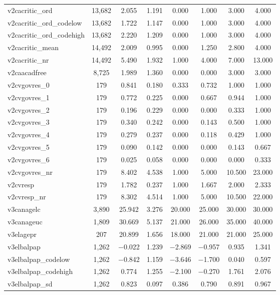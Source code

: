 \begin{table}[!htbp]
\begin{tabular}{@{\extracolsep{5pt}}lccccccc}
v2cacritic\_ord & 13,682 & 2.055 & 1.191 & 0.000 & 1.000 & 3.000 & 4.000 \\ 
v2cacritic\_ord\_codelow & 13,682 & 1.722 & 1.147 & 0.000 & 1.000 & 3.000 & 4.000 \\ 
v2cacritic\_ord\_codehigh & 13,682 & 2.220 & 1.209 & 0.000 & 1.000 & 3.000 & 4.000 \\ 
v2cacritic\_mean & 14,492 & 2.009 & 0.995 & 0.000 & 1.250 & 2.800 & 4.000 \\ 
v2cacritic\_nr & 14,492 & 5.490 & 1.932 & 1.000 & 4.000 & 7.000 & 13.000 \\ 
v2caacadfree & 8,725 & 1.989 & 1.360 & 0.000 & 0.000 & 3.000 & 3.000 \\ 
v2cvgovres\_0 & 179 & 0.841 & 0.180 & 0.333 & 0.732 & 1.000 & 1.000 \\ 
v2cvgovres\_1 & 179 & 0.772 & 0.225 & 0.000 & 0.667 & 0.944 & 1.000 \\ 
v2cvgovres\_2 & 179 & 0.196 & 0.229 & 0.000 & 0.000 & 0.333 & 1.000 \\ 
v2cvgovres\_3 & 179 & 0.340 & 0.242 & 0.000 & 0.143 & 0.500 & 1.000 \\ 
v2cvgovres\_4 & 179 & 0.279 & 0.237 & 0.000 & 0.118 & 0.429 & 1.000 \\ 
v2cvgovres\_5 & 179 & 0.090 & 0.142 & 0.000 & 0.000 & 0.143 & 0.667 \\ 
v2cvgovres\_6 & 179 & 0.025 & 0.058 & 0.000 & 0.000 & 0.000 & 0.333 \\ 
v2cvgovres\_nr & 179 & 8.402 & 4.538 & 1.000 & 5.000 & 10.500 & 23.000 \\ 
v2cvresp & 179 & 1.782 & 0.237 & 1.000 & 1.667 & 2.000 & 2.333 \\ 
v2cvresp\_nr & 179 & 8.302 & 4.514 & 1.000 & 5.000 & 10.500 & 22.000 \\ 
v3canagelc & 3,890 & 25.942 & 3.276 & 20.000 & 25.000 & 30.000 & 30.000 \\ 
v3canageuc & 1,809 & 30.669 & 5.137 & 21.000 & 26.000 & 35.000 & 40.000 \\ 
v3elagepr & 207 & 20.899 & 1.656 & 18.000 & 21.000 & 21.000 & 25.000 \\ 
v3elbalpap & 1,262 & $-$0.022 & 1.239 & $-$2.869 & $-$0.957 & 0.935 & 1.341 \\ 
v3elbalpap\_codelow & 1,262 & $-$0.842 & 1.159 & $-$3.646 & $-$1.700 & 0.040 & 0.597 \\ 
v3elbalpap\_codehigh & 1,262 & 0.774 & 1.255 & $-$2.100 & $-$0.270 & 1.761 & 2.076 \\ 
v3elbalpap\_sd & 1,262 & 0.823 & 0.097 & 0.386 & 0.790 & 0.891 & 0.967 \\ 

\end{tabular}
\end{table}
